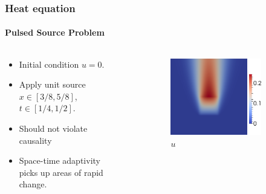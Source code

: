 \documentclass[18pt,xcolor=table]{beamer}
\begin{document}
\begin{frame}[t]
\frametitle{Heat equation}
\framesubtitle{Pulsed Source Problem}  %
\vspace{-1ex}
\begin{columns}[t] %
\begin{column}[c]{0.3\textwidth} %
\begin{itemize}
  \item Initial condition $u=0$.
  \item Apply unit source $x\in[3/8,5/8]$,\\$t\in[1/4,1/2]$.
  \item Should not violate causality
  \item Space-time adaptivity picks up areas of rapid change.
\end{itemize}
\end{column}
\begin{column}[c]{0.7\textwidth} %
\begin{figure}[ht]
\centering
\begin{subfigure}[t]{0.45\textwidth}
\centering
\includegraphics[height=0.8\textwidth]{SpaceTimeHeat/PulseSource/u.png}
\\$u$\\\vspace{1ex}
\end{subfigure}

\end{figure}
\end{column}
\end{columns}
\end{frame}
\end{document}
